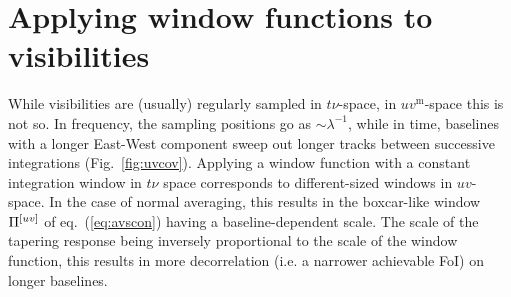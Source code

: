 \documentclass[useAMS,usenatbib]{mn2e}
\newcommand{\OMS}[1]{\textcolor{red}{{\bf OMS: #1}}}
\begin{document}
%
%
%
%
%

\section{Applying window functions to visibilities}

While visibilities are (usually) regularly sampled in $t\nu$-space, in $uv^\mathrm{m}$-space this is not so. In frequency, 
the sampling positions go as $\sim\lambda^{-1}$, while in time, baselines with a longer East-West component sweep out longer tracks between successive 
integrations (Fig.~\ref{fig:uvcov}). Applying a window function with a constant integration window in $t\nu$ space corresponds to 
different-sized windows in $uv$-space. In the case of normal averaging, this results in the boxcar-like window $\Pi^{[uv]}$ of 
eq.~(\ref{eq:avscon}) having a baseline-dependent scale. The scale of the tapering response being inversely proportional to 
the scale of the window function, this results in more decorrelation (i.e. a
narrower achievable FoI) on longer baselines.
\end{document}
